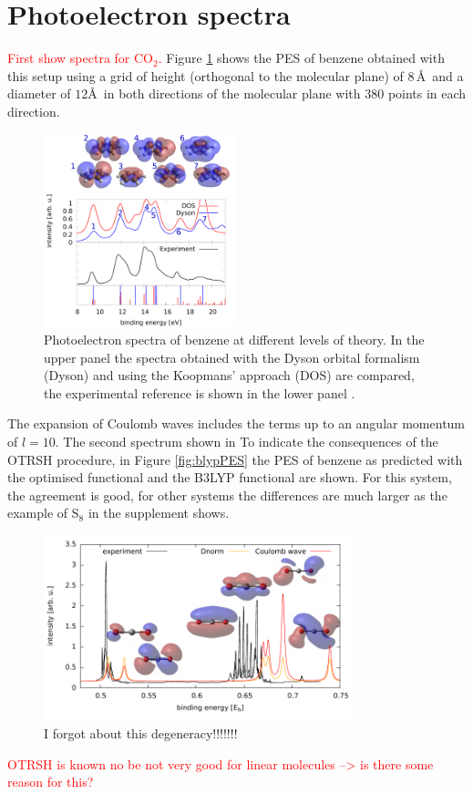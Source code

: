\section{Photoelectron spectra}
\textcolor{red}{First show spectra for CO$_2$.}
Figure \ref{fig:benzPES} shows the PES of benzene obtained with this setup using a grid of height (orthogonal to the molecular plane) of $8\,$\AA\, and a diameter of $12$\AA\, in both directions of the molecular plane with $380$ points in each direction.
\begin{figure}
   \includegraphics[width=0.5\textwidth]{Figures/Benzene/Benzene}
   \caption{Photoelectron spectra of benzene at different levels of theory.
   In the upper panel the spectra obtained with the Dyson orbital formalism (Dyson) and using the Koopmans' approach (DOS) are compared, the experimental reference is shown in the lower panel \cite{BenzExp}.}
   \label{fig:benzPES}
\end{figure}
The expansion of Coulomb waves includes the terms up to an angular momentum of $l=10$.
The second spectrum shown in 
To indicate the consequences of the OTRSH procedure, in Figure \ref{fig:blypPES} the PES of benzene as predicted with the optimised functional and the B3LYP functional are shown.
For this system, the agreement is good, for other systems the differences are much larger as the example of S$_8$ in the supplement shows.
\begin{figure}
   \includegraphics[width=0.8\textwidth]{Figures/CO2/CO2_spect}
   \caption{I forgot about this degeneracy!!!!!!!}
\end{figure}
\textcolor{red}{
OTRSH is known no be not very good for linear molecules --> is there some reason for this?
}
